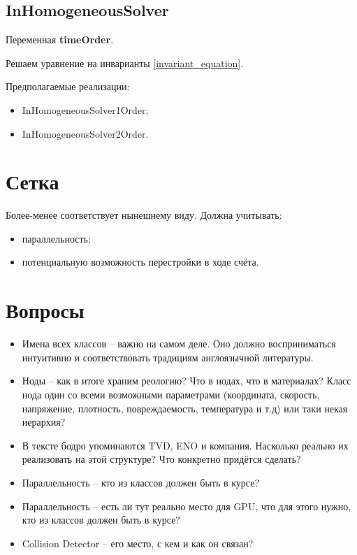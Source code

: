 \documentclass[a4paper,12pt]{article}
\numberwithin{equation}{section}
\begin{document}
\subsection{InHomogeneousSolver}
	Переменная \textbf{timeOrder}.
	
	Решаем уравнение на инварианты \eqref{invariant_equation}.
	
	Предполагаемые реализации:
		\begin{itemize}
			\item{InHomogeneousSolver1Order;}
			\item{InHomogeneousSolver2Order.}
		\end{itemize}


\section{Сетка}

Более-менее соответствует нынешнему виду. Должна учитывать: 
	\begin{itemize}
		\item{параллельность;}
		\item{потенциальную возможность перестройки в ходе счёта.}
	\end{itemize}

\section{Вопросы}
	\begin{itemize}
		\item{Имена всех классов -- важно на самом деле. Оно должно восприниматься интуитивно и соответствовать традициям англоязычной литературы.}
		\item{Ноды -- как в итоге храним реологию? Что в нодах, что в материалах? Класс нода один со всеми возможными параметрами (координата, скорость, напряжение, плотность, повреждаемость, температура и т.д) или таки некая иерархия?}
		\item{В тексте бодро упоминаются TVD, ENO и компания. Насколько реально их реализовать на этой структуре? Что конкретно придётся сделать?}
		\item{Параллельность -- кто из классов должен быть в курсе?}
		\item{Параллельность -- есть ли тут реально место для GPU, что для этого нужно, кто из классов должен быть в курсе?}
		\item{Collision Detector -- его место, с кем и как он связан?}
	\end{itemize}

\listoftodos
\end{document}
